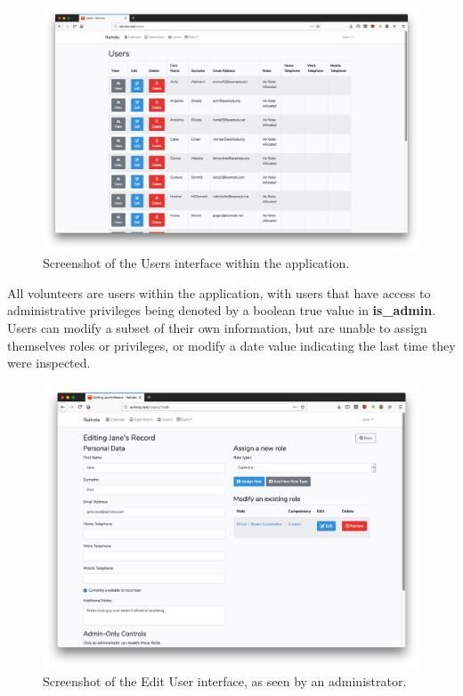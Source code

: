 \begin{figure}[!ht]
    \centering
    \includegraphics[width=1.0\textwidth]{Figures/screenshot-users}
    \caption{Screenshot of the Users interface within the application.}
    \label{fig:users}
\end{figure}

All volunteers are users within the application, with users that have access to administrative privileges being denoted by a boolean true value in \textbf{is\_admin}. Users can modify a subset of their own information, but are unable to assign themselves roles or privileges, or modify a date value indicating the last time they were inspected.

\begin{figure}[!ht]
    \centering
    \includegraphics[width=1.0\textwidth]{Figures/screenshot-edit-user}
    \caption{Screenshot of the Edit User interface, as seen by an administrator.}
    \label{fig:users-edit}
\end{figure}

